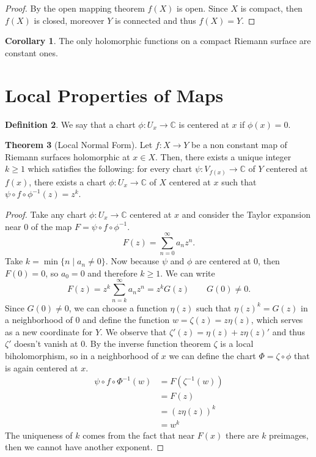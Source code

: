 \documentclass[12pt,a4paper,openright,twoside]{report}
\theoremstyle{definition} %
\newtheorem{theorem}{Theorem}[chapter]
\newtheorem{corollary}[theorem]{Corollary}
\newtheorem{definition}[theorem]{Definition}
\def \C {\mathbb{C}}
\begin{document}
\begin{proof}
    By the open mapping theorem \(f(X)\) is open. Since \(X\) is compact, then \(f(X)\) is closed, moreover \(Y\) is connected and thus \(f(X)=Y\).
\end{proof}

\begin{corollary}
    The only holomorphic functions on a compact Riemann surface are constant ones.
\end{corollary}

\section{Local Properties of Maps }

\begin{definition}
    We say that a chart \(\phi : U_x \to \C\) is centered at \(x\) if \(\phi(x)=0\).
\end{definition}

\begin{theorem}[Local Normal Form]\label{thm:LocalNormalForm}
    Let \(f : X \to Y\) be a non constant map of Riemann surfaces holomorphic at \(x \in X\). Then, there exists a unique integer \(k \geq 1\) which satisfies the following: for every chart \(\psi : V_{f(x)} \to \C\) of \(Y\) centered at \(f(x)\), there exists a chart \(\phi : U_x \to \C\) of \(X\) centered at \(x\) such that \( \psi \circ f \circ \phi^{-1}(z) = z^k\).
\end{theorem}

\begin{proof}
    Take any chart \(\phi : U_x \to \C\) centered at \(x\) and consider the Taylor expansion near \(0\) of the map \(F = \psi \circ f \circ \phi^{-1}\).
    \[
    F(z) = \sum_{n=0}^{\infty} a_n z^n.
    \]
    Take \(k = \min\{n \; | \; a_n \neq 0\}\).
    Now because \(\psi\) and \(\phi\) are centered at \(0\), then \(F(0)=0\), so \(a_0 = 0\) and therefore \(k \geq 1\).
    We can write
    \[
    F(z) = z^k \sum_{n=k}^{\infty} a_n z^n = z^k G(z) \qquad G(0) \neq 0.
    \]
    Since \(G(0) \neq 0\), we can choose a function \(\eta(z)\) such that \(\eta(z)^k = G(z)\) in a neighborhood of \(0\) and define the function \(w=\zeta(z) = z \eta(z)\), which serves as a new coordinate for \(Y\).
    We observe that \(\zeta'(z) = \eta(z) + z \eta(z)'\) and thus \(\zeta'\) doesn't vanish at \(0\). By the inverse function theorem \(\zeta\) is a local biholomorphism, so in a neighborhood of \(x\) we can define the chart \(\Phi = \zeta \circ \phi\) that is again centered at \(x\).
    \begin{align*}
    \psi \circ f \circ \Phi^{-1} (w) &= F(\zeta^{-1}(w)) \\
    &= F(z) \\
    &= (z \eta(z))^k \\
    &= w^k
    \end{align*}
    The uniqueness of \(k\) comes from the fact that near \(F(x)\) there are \(k\) preimages, then we cannot have another exponent.
\end{proof}
\end{document}
